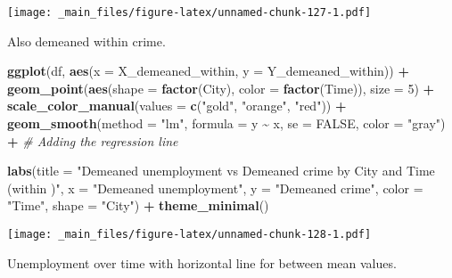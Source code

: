 \documentclass[
]{book}
\newenvironment{Shaded}{\begin{snugshade}}{\end{snugshade}}
\newcommand{\AttributeTok}[1]{\textcolor[rgb]{0.13,0.29,0.53}{#1}}
\newcommand{\CommentTok}[1]{\textcolor[rgb]{0.56,0.35,0.01}{\textit{#1}}}
\newcommand{\ConstantTok}[1]{\textcolor[rgb]{0.56,0.35,0.01}{#1}}
\newcommand{\DecValTok}[1]{\textcolor[rgb]{0.00,0.00,0.81}{#1}}
\newcommand{\FunctionTok}[1]{\textcolor[rgb]{0.13,0.29,0.53}{\textbf{#1}}}
\newcommand{\NormalTok}[1]{#1}
\newcommand{\SpecialCharTok}[1]{\textcolor[rgb]{0.81,0.36,0.00}{\textbf{#1}}}
\newcommand{\StringTok}[1]{\textcolor[rgb]{0.31,0.60,0.02}{#1}}
\begin{document}
\texttt{[image: \_main\_files/figure-latex/unnamed-chunk-127-1.pdf]}

Also demeaned within crime.

\begin{Shaded}
\begin{Highlighting}[]
\FunctionTok{ggplot}\NormalTok{(df, }\FunctionTok{aes}\NormalTok{(}\AttributeTok{x =}\NormalTok{ X\_demeaned\_within, }\AttributeTok{y =}\NormalTok{ Y\_demeaned\_within)) }\SpecialCharTok{+}
  \FunctionTok{geom\_point}\NormalTok{(}\FunctionTok{aes}\NormalTok{(}\AttributeTok{shape =} \FunctionTok{factor}\NormalTok{(City), }\AttributeTok{color =} \FunctionTok{factor}\NormalTok{(Time)), }\AttributeTok{size =} \DecValTok{5}\NormalTok{) }\SpecialCharTok{+}
  \FunctionTok{scale\_color\_manual}\NormalTok{(}\AttributeTok{values =} \FunctionTok{c}\NormalTok{(}\StringTok{"gold"}\NormalTok{, }\StringTok{"orange"}\NormalTok{, }\StringTok{"red"}\NormalTok{)) }\SpecialCharTok{+}
  \FunctionTok{geom\_smooth}\NormalTok{(}\AttributeTok{method =} \StringTok{"lm"}\NormalTok{, }\AttributeTok{formula =}\NormalTok{ y }\SpecialCharTok{\textasciitilde{}}\NormalTok{ x, }\AttributeTok{se =} \ConstantTok{FALSE}\NormalTok{, }\AttributeTok{color =} \StringTok{"gray"}\NormalTok{) }\SpecialCharTok{+}  \CommentTok{\# Adding the regression line}

  \FunctionTok{labs}\NormalTok{(}\AttributeTok{title =} \StringTok{"Demeaned unemployment vs Demeaned crime by City and Time (within )"}\NormalTok{,}
       \AttributeTok{x =} \StringTok{"Demeaned unemployment"}\NormalTok{,}
       \AttributeTok{y =} \StringTok{"Demeaned crime"}\NormalTok{,}
       \AttributeTok{color =} \StringTok{"Time"}\NormalTok{,}
       \AttributeTok{shape =} \StringTok{"City"}\NormalTok{) }\SpecialCharTok{+}
  \FunctionTok{theme\_minimal}\NormalTok{()}
\end{Highlighting}
\end{Shaded}

\texttt{[image: \_main\_files/figure-latex/unnamed-chunk-128-1.pdf]}

Unemployment over time with horizontal line for between mean values.
\end{document}
